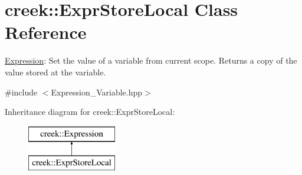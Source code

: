 \hypertarget{classcreek_1_1_expr_store_local}{}\section{creek\+:\+:Expr\+Store\+Local Class Reference}
\label{classcreek_1_1_expr_store_local}


\hyperlink{classcreek_1_1_expression}{Expression}\+: Set the value of a variable from current scope. Returns a copy of the value stored at the variable.  




{\ttfamily \#include $<$Expression\+\_\+\+Variable.\+hpp$>$}

Inheritance diagram for creek\+:\+:Expr\+Store\+Local\+:\begin{figure}[H]
\begin{center}
\leavevmode
\includegraphics[height=2.000000cm]{classcreek_1_1_expr_store_local}
\end{center}
\end{figure}
